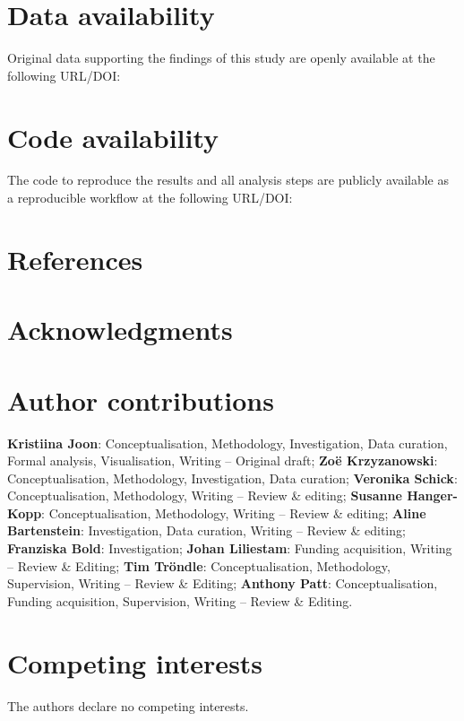 \documentclass[10pt,letterpaper]{article}
\begin{document}
\section*{Data availability}
Original data supporting the findings of this study are openly available at the following URL/DOI:

\section*{Code availability}
The code to reproduce the results and all analysis steps are publicly available as a reproducible workflow at the following URL/DOI: 

\section*{References}
\printbibliography[heading=none]


\section*{Acknowledgments}


\section*{Author contributions}
\textbf{Kristiina Joon}: Conceptualisation, Methodology, Investigation, Data curation, Formal analysis, Visualisation, Writing -- Original draft;
\textbf{Zoë Krzyzanowski}: Conceptualisation, Methodology, Investigation, Data curation;
\textbf{Veronika Schick}: Conceptualisation, Methodology, Writing -- Review \& editing;
\textbf{Susanne Hanger-Kopp}: Conceptualisation, Methodology, Writing -- Review \& editing;
\textbf{Aline Bartenstein}: Investigation, Data curation, Writing -- Review \& editing;
\textbf{Franziska Bold}: Investigation;
\textbf{Johan Liliestam}: Funding acquisition, Writing -- Review \& Editing; 
\textbf{Tim Tröndle}: Conceptualisation, Methodology, Supervision, Writing -- Review \& Editing;
\textbf{Anthony Patt}: Conceptualisation, Funding acquisition, Supervision, Writing -- Review \& Editing.

\section*{Competing interests}
The authors declare no competing interests.
\end{document}
